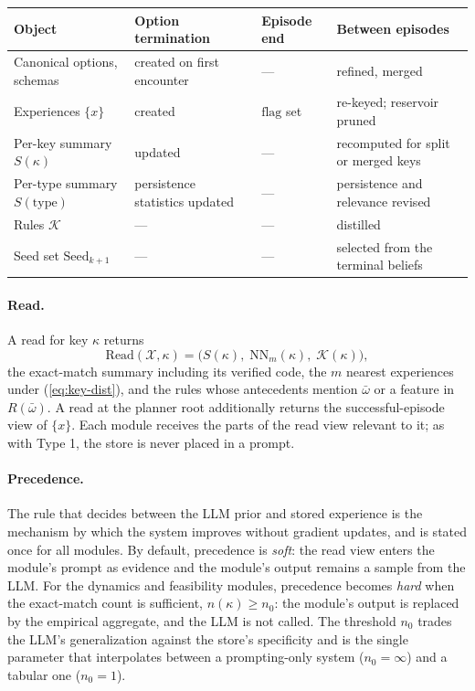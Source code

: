 \documentclass[11pt]{article}
\newcommand{\calK}{\mathcal{K}}
\newcommand{\calX}{\mathcal{X}}
\newcommand{\Rel}{R}
\newcommand{\Read}{\mathrm{Read}}
\newcommand{\type}{\mathrm{type}}
\begin{document}
\begin{center}\small
\begin{tabular}{@{}>{\raggedright\arraybackslash}p{}>{\raggedright\arraybackslash}p{}>{\raggedright\arraybackslash}p{}>{\raggedright\arraybackslash}p{}@{}}
\toprule
Object & Option termination & Episode end & Between episodes \\
\midrule
Canonical options, schemas & created on first encounter & --- & refined, merged \\
Experiences $\{x\}$ & created & $\mathrm{flag}$ set & re-keyed; reservoir pruned \\
Per-key summary $S(\kappa)$ & updated & --- & recomputed for split or merged keys \\
Per-type summary $S(\type)$ & persistence statistics updated & --- & persistence and relevance revised \\
Rules $\calK$ & --- & --- & distilled \\
Seed set $\mathrm{Seed}_{k+1}$ & --- & --- & selected from the terminal beliefs \\
\bottomrule
\end{tabular}
\end{center}

\paragraph{Read.}
A read for key $\kappa$ returns
\begin{equation}
\Read(\calX,\kappa)=\big(S(\kappa),\;\mathrm{NN}_m(\kappa),\;\calK(\kappa)\big),
\label{eq:type2-read}
\end{equation}
the exact-match summary including its verified code, the $m$ nearest experiences under (\ref{eq:key-dist}), and the rules whose antecedents mention $\bar\omega$ or a feature in $\Rel(\bar\omega)$. A read at the planner root additionally returns the successful-episode view of $\{x\}$. Each module receives the parts of the read view relevant to it; as with Type 1, the store is never placed in a prompt.

\paragraph{Precedence.}
The rule that decides between the LLM prior and stored experience is the mechanism by which the system improves without gradient updates, and is stated once for all modules. By default, precedence is \emph{soft}: the read view enters the module's prompt as evidence and the module's output remains a sample from the LLM. For the dynamics and feasibility modules, precedence becomes \emph{hard} when the exact-match count is sufficient, $n(\kappa)\ge n_0$: the module's output is replaced by the empirical aggregate, and the LLM is not called. The threshold $n_0$ trades the LLM's generalization against the store's specificity and is the single parameter that interpolates between a prompting-only system ($n_0=\infty$) and a tabular one ($n_0=1$).
\end{document}

